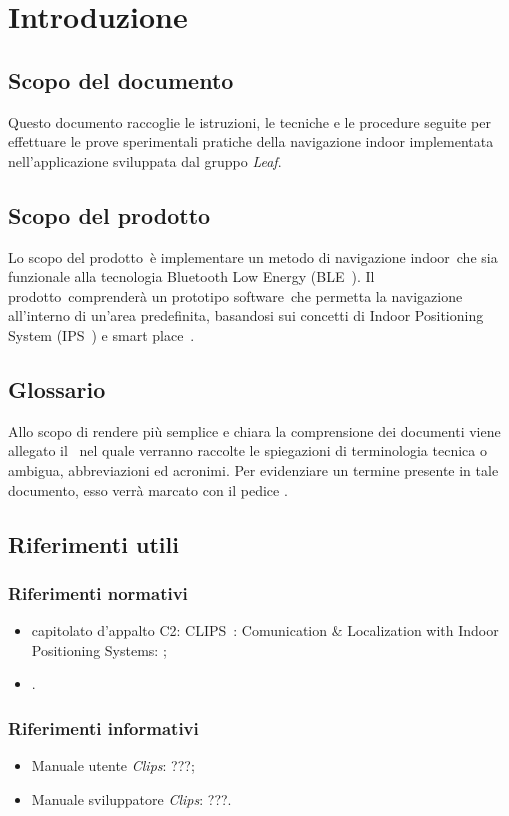 \documentclass[../Sperimentazioni.tex]{subfiles}
\begin{document}
\section{Introduzione}

	\subsection{Scopo del documento}
		Questo documento raccoglie le istruzioni, le tecniche e le procedure seguite per effettuare le prove sperimentali pratiche della navigazione indoor implementata nell'applicazione sviluppata dal gruppo \textit{Leaf}.
	
	\subsection{Scopo del prodotto}
		Lo scopo del prodotto\g\ è implementare un metodo di navigazione indoor\g\ che sia funzionale alla tecnologia Bluetooth Low Energy (BLE\g\ ). Il prodotto\g\ comprenderà un prototipo software\g\ che permetta la navigazione all'interno di un'area predefinita, basandosi sui concetti di Indoor Positioning System (IPS\g\ ) e smart place\g\ .
	
	\subsection{Glossario} \label{sec:Glossario}
	Allo scopo di rendere più semplice e chiara la comprensione dei documenti viene allegato il \glossariov\ nel quale verranno raccolte le spiegazioni di  terminologia tecnica o  ambigua, abbreviazioni ed acronimi. Per evidenziare un termine presente in tale documento, esso verrà marcato con il pedice \g .
	
	
	\subsection{Riferimenti utili}
	
		\subsubsection{Riferimenti normativi}
		\begin{itemize}
			\item capitolato d'appalto C2: CLIPS\g\ : Comunication \& Localization with Indoor Positioning Systems:
			;
			\item \normediprogettov.
		\end{itemize}
		
		\subsubsection{Riferimenti informativi}
		\begin{itemize}
			\item Manuale utente \textit{Clips}: ???;
			\item Manuale sviluppatore \textit{Clips}: ???.
		\end{itemize}
		
\end{document}
